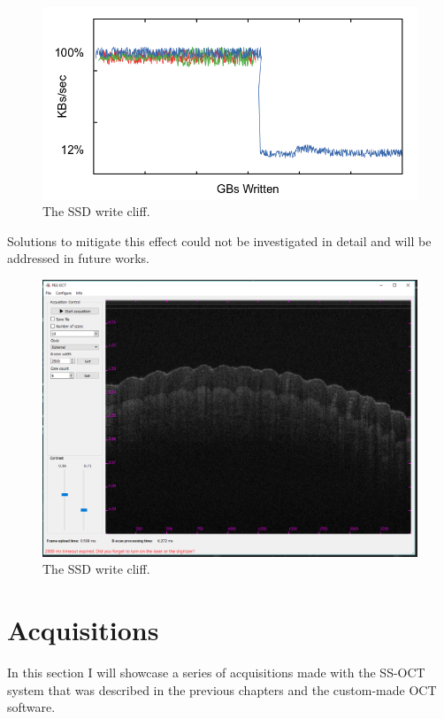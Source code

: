 \begin{figure}[htb]
	\myfloatalign
	\includegraphics[width=0.8\linewidth]{gfx/ch4/write-cliff}
	\caption{The SSD write cliff.}\label{fig:write-cliff}
\end{figure}

Solutions to mitigate this effect could not be investigated in detail and will be addressed in future works. 


\begin{figure}[htb]
	\myfloatalign
	\includegraphics[width=0.8\linewidth]{gfx/ch4/gui}
	\caption{The SSD write cliff.}\label{fig:gui}
\end{figure}

\section{Acquisitions}
In this section I will showcase a series of acquisitions made with the SS-OCT system that was described in the previous chapters and the custom-made OCT software. \\

